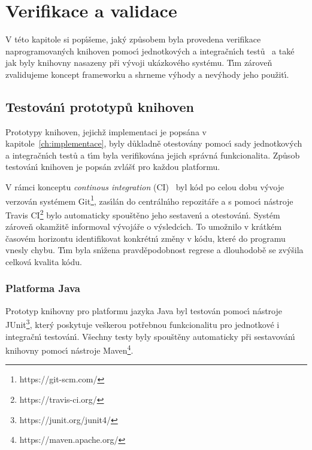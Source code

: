 

\chapter{Verifikace a validace}\label{ch:verifikace}

V této kapitole si pop\'{\i}šeme, jak\'y způsobem byla provedena
verifikace naprogramovan\'ych knihoven pomoc\'{\i}
jednotkov\'ych a integračn\'{\i}ch testů~\cite{luo2001software}
a také jak byly knihovny nasazeny při v\'yvoji ukázkového systému.
T\'{\i}m zároveň zvalidujeme koncept frameworku a shrneme v\'yhody
a nev\'yhody jeho použit\'{\i}.

\section{Testován\'{\i} prototypů knihoven}

Prototypy knihoven, jejichž implementaci je popsána v kapitole~\ref{ch:implementace},
byly důkladně otestovány pomoc\'{\i} sady jednotkov\'ych a integračn\'{\i}ch testů
a t\'{\i}m byla verifikována jejich správná funkcionalita. Způsob
testován\'{\i} knihoven je popsán zvlášť pro každou platformu.

V rámci konceptu \textit{continous integration} (\gls{CI})~\cite{fowler2006continuous}
byl kód po celou dobu v\'yvoje verzován systémem Git\footnote{https://git-scm.com/},
zas\'{\i}lán do centráln\'{\i}ho repozitáře a s pomoc\'{\i}
nástroje Travis \gls{CI}\footnote{https://travis-ci.org/}
bylo automaticky spouštěno jeho sestaven\'{\i} a otestován\'{\i}.
Systém zároveň okamžitě informoval v\'yvojáře o v\'ysledc\'{\i}ch.
To umožnilo v krátkém časovém horizontu identifikovat konkrétn\'{\i} změny
v kódu, které do programu vnesly chybu. T\'{\i}m byla sn\'{\i}žena
pravděpodobnost regrese a dlouhodobě se zv\'yšila celková kvalita kódu.

\subsection{Platforma Java}

Prototyp knihovny pro platformu jazyka Java byl testován pomoc\'{\i}
nástroje JUnit\footnote{https://junit.org/junit4/}, kter\'y poskytuje veškerou potřebnou funkcionalitu pro
jednotkové i integračn\'{\i} testován\'{\i}. Všechny testy byly spouštěny automaticky
při sestavován\'{\i} knihovny pomoc\'{\i} nástroje Maven\footnote{https://maven.apache.org/}.

